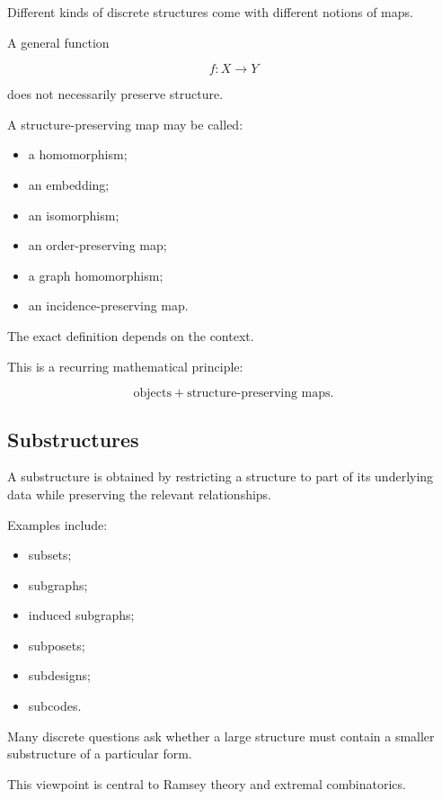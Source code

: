 Different kinds of discrete structures come with different notions of
maps.

A general function

\[
f:X\to Y
\]

does not necessarily preserve structure.

A structure-preserving map may be called:

\begin{itemize}
    \item a homomorphism;
    \item an embedding;
    \item an isomorphism;
    \item an order-preserving map;
    \item a graph homomorphism;
    \item an incidence-preserving map.
\end{itemize}

The exact definition depends on the context.

This is a recurring mathematical principle:

\[
\boxed{
\text{objects}
+
\text{structure-preserving maps}.
}
\]

\subsection{Substructures}
\label{subsec:discrete-substructures}

A substructure is obtained by restricting a structure to part of its
underlying data while preserving the relevant relationships.

Examples include:

\begin{itemize}
    \item subsets;
    \item subgraphs;
    \item induced subgraphs;
    \item subposets;
    \item subdesigns;
    \item subcodes.
\end{itemize}

Many discrete questions ask whether a large structure must contain a
smaller substructure of a particular form.

This viewpoint is central to Ramsey theory and extremal combinatorics.


